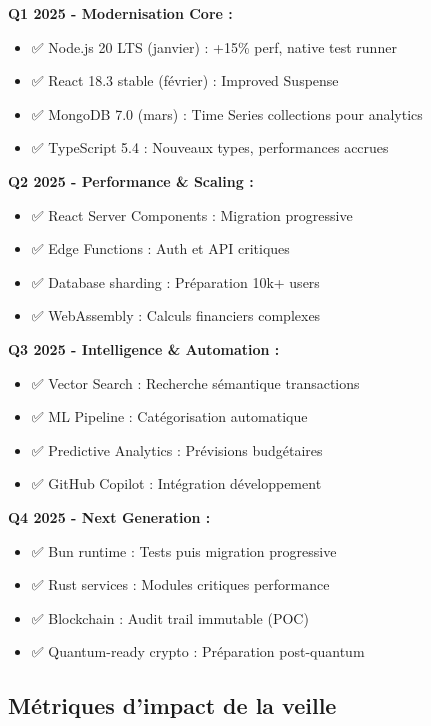 \begin{tcolorbox}[colback=blue!5!white,colframe=blue!60!black,title=\textbf{Plan de migration et évolutions planifiées}]
\textbf{Q1 2025 - Modernisation Core :}
\begin{itemize}
    \item ✅ Node.js 20 LTS (janvier) : +15\% perf, native test runner
    \item ✅ React 18.3 stable (février) : Improved Suspense
    \item ✅ MongoDB 7.0 (mars) : Time Series collections pour analytics
    \item ✅ TypeScript 5.4 : Nouveaux types, performances accrues
\end{itemize}

\textbf{Q2 2025 - Performance  \& Scaling :}
\begin{itemize}
    \item ✅ React Server Components : Migration progressive
    \item ✅ Edge Functions : Auth et API critiques
    \item ✅ Database sharding : Préparation 10k+ users
    \item ✅ WebAssembly : Calculs financiers complexes
\end{itemize}

\textbf{Q3 2025 - Intelligence  \& Automation :}
\begin{itemize}
    \item ✅ Vector Search : Recherche sémantique transactions
    \item ✅ ML Pipeline : Catégorisation automatique
    \item ✅ Predictive Analytics : Prévisions budgétaires
    \item ✅ GitHub Copilot : Intégration développement
\end{itemize}

\textbf{Q4 2025 - Next Generation :}
\begin{itemize}
    \item ✅ Bun runtime : Tests puis migration progressive
    \item ✅ Rust services : Modules critiques performance
    \item ✅ Blockchain : Audit trail immutable (POC)
    \item ✅ Quantum-ready crypto : Préparation post-quantum
\end{itemize}
\end{tcolorbox}

\subsection{Métriques d'impact de la veille}


